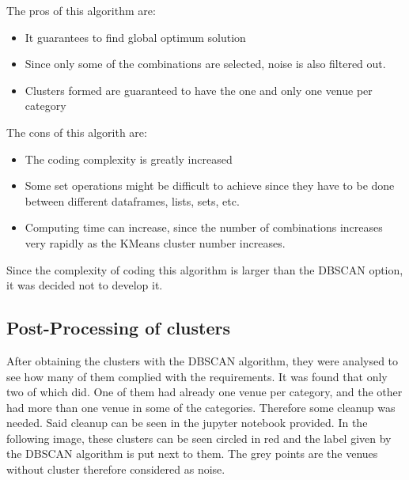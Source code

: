 \documentclass{article}
\begin{document}
		The pros of this algorithm are:
		\begin{itemize}
			\item It guarantees to find global optimum solution
			\item Since only some of the combinations are selected, noise is also filtered out.
			\item Clusters formed are guaranteed to have the one and only one venue per category
		\end{itemize} 
		The cons of this algorith are:
		\begin{itemize}
			\item The coding complexity is greatly increased
			\item Some set operations might be difficult to achieve since they have to be done between different dataframes, lists, sets, etc.
			\item Computing time can increase, since the number of combinations increases very rapidly as the KMeans cluster number increases.
		\end{itemize}	
		
		Since the complexity of coding this algorithm is larger than the DBSCAN option, it was decided not to develop it.
		
	\subsection{Post-Processing of clusters}
	
	After obtaining the clusters with the DBSCAN algorithm, they were analysed to see how many of them complied with the requirements. It was found that only two of which did. One of them had already one venue per category, and the other had more than one venue in some of the categories. Therefore some cleanup was needed. Said cleanup can be seen in the jupyter notebook provided. In the following image, these clusters can be seen circled in red and the label given by the DBSCAN algorithm is put next to them. The grey points are the venues without cluster therefore considered as noise.
	
\end{document}
